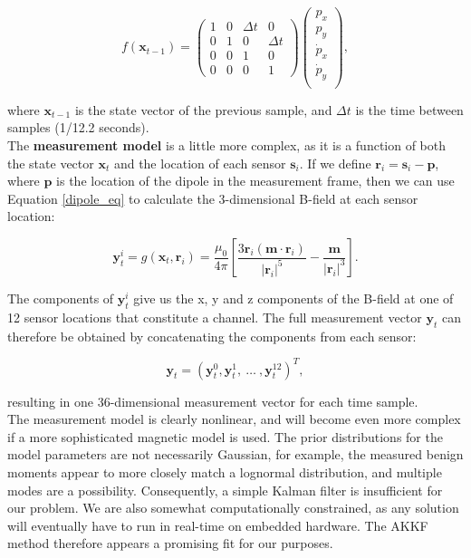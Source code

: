 \documentclass[10pt, a4paper, twocolumn]{article} %
\begin{document}
\begin{equation}
	f(\mathbf{x}_{t-1}) = \begin{pmatrix}
		1 & 0 & \Delta t & 0\\
		0 & 1 & 0 & \Delta t\\
		0 & 0 & 1 & 0\\
		0 & 0 & 0 & 1
	\end{pmatrix}
	\begin{pmatrix}
		p_x \\
		p_y \\
		\dot p_x \\
		\dot p_y \\
	\end{pmatrix},
	\label{simple_transition}
\end{equation}

where $\mathbf{x}_{t-1}$ is the state vector of the previous sample, and $\Delta t$ is the time between samples (1/12.2 seconds).\\

The \textbf{measurement model} is a little more complex, as it is a function of both the state vector $\mathbf{x}_t$ and the location of each sensor $\mathbf{s}_i$. If we define $\mathbf{r}_i = \mathbf{s}_i - \mathbf{p}$, where $\mathbf{p}$ is the location of the dipole in the measurement frame, then we can use Equation \ref{dipole_eq} to calculate the 3-dimensional B-field at each sensor location:

\begin{equation}
	\mathbf{y}_{t}^{i} = g(\mathbf{x}_t,\mathbf{r}_i) = {\frac{\mu_{0}}{4\pi}} \left[{\frac {3\mathbf{r}_i (\mathbf{m} \cdot \mathbf{r}_i )}{\lvert \mathbf{r}_i \rvert^{5}}}-{\frac {\mathbf {m} }{\lvert \mathbf{r}_i \rvert^{3}}} \right].
\end{equation}

The components of $\mathbf{y}_t^i$ give us the x, y and z components of the B-field at one of 12 sensor locations that constitute a channel. The full measurement vector $\mathbf{y}_t$ can therefore be obtained by concatenating the components from each sensor:

\begin{equation}
	\mathbf{y}_t = (\mathbf{y}_t^0, \mathbf{y}_t^1, \ \ldots \ , \mathbf{y}_t^{12})^T,
\end{equation}

resulting in one 36-dimensional measurement vector for each time sample.\\

The measurement model is clearly nonlinear, and will become even more complex if a more sophisticated magnetic model is used. The prior distributions for the model parameters are not necessarily Gaussian, for example, the measured benign moments appear to more closely match a lognormal distribution, and multiple modes are a possibility. Consequently, a simple Kalman filter is insufficient for our problem. We are also somewhat computationally constrained, as any solution will eventually have to run in real-time on embedded hardware. The AKKF method therefore appears a promising fit for our purposes.
\end{document}

